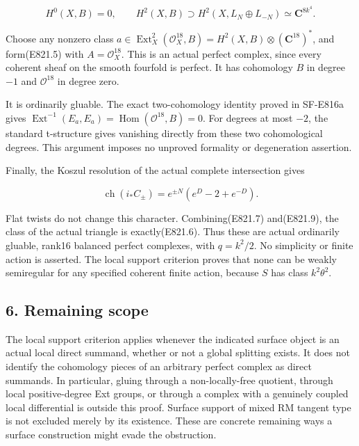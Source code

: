 \[
 H^0(X,B)=0,
 \qquad H^2(X,B)\supset H^2(X,L_N\oplus L_{-N})
                  \simeq\mathbf C^{8k^4}.
 \tag{E821.8}
\]

Choose any nonzero class
\(a\in\operatorname{Ext}^2_X(\mathcal O_X^{18},B)
=H^2(X,B)\otimes(\mathbf C^{18})^*\), and form(E821.5) with
\(A=\mathcal O_X^{18}\). This is an actual perfect complex, since every
coherent sheaf on the smooth fourfold is perfect. It has cohomology
\(B\) in degree \(-1\) and \(\mathcal O^{18}\) in degree zero.

It is ordinarily gluable. The exact two-cohomology identity proved in
SF-E816a gives
\(\operatorname{Ext}^{-1}(E_a,E_a)=\operatorname{Hom}(\mathcal O^{18},B)=0\).
For degrees at most \(-2\), the standard t-structure gives vanishing
directly from these two cohomological degrees. This argument imposes no
unproved formality or degeneration assertion.

Finally, the Koszul resolution of the actual complete intersection gives

\[
 \operatorname{ch}(i_*C_\pm)
   =e^{\pm N}(e^D-2+e^{-D}).
 \tag{E821.9}
\]

Flat twists do not change this character. Combining(E821.7) and(E821.9),
the class of the actual triangle is exactly(E821.6). Thus these are
actual ordinarily gluable, rank16 balanced perfect complexes, with
\(q=k^2/2\). No simplicity or finite action is asserted. The local
support criterion proves that none can be weakly semiregular for any
specified coherent finite action, because \(S\) has class
\(k^2\theta^2\).

\subsection{6. Remaining scope}\label{SF-E821-remaining-scope}

The local support criterion applies whenever the indicated surface
object is an actual local direct summand, whether or not a global
splitting exists. It does not identify the cohomology pieces of an
arbitrary perfect complex as direct summands. In particular, gluing
through a non-locally-free quotient, through local positive-degree Ext
groups, or through a complex with a genuinely coupled local differential
is outside this proof. Surface support of mixed RM tangent type is not
excluded merely by its existence. These are concrete remaining ways a
surface construction might evade the obstruction.
